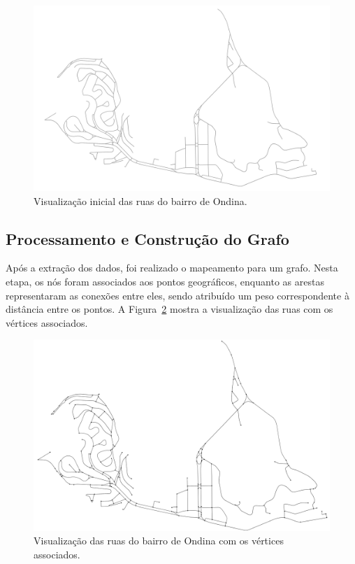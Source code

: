 \documentclass[12pt, a4paper]{report}
\begin{document}
\begin{figure}[H]
    \centering
    \includegraphics[width=\textwidth]{visualizacao_inicial}
    \caption{Visualização inicial das ruas do bairro de Ondina.}
    \label{fig:ondina_ruas}
\end{figure}

\subsection{Processamento e Construção do Grafo}

Após a extração dos dados, foi realizado o mapeamento para um grafo. Nesta etapa, os nós foram associados aos pontos geográficos, enquanto as arestas representaram as conexões entre eles, sendo atribuído um peso correspondente à distância entre os pontos. A Figura~\ref{fig:ondina_grafo_bruto} mostra a visualização das ruas com os vértices associados.

\begin{figure}[H]
    \centering
    \includegraphics[width=\textwidth]{ondina_grafo_bruto}
    \caption{Visualização das ruas do bairro de Ondina com os vértices associados.}
    \label{fig:ondina_grafo_bruto}
\end{figure}
\end{document}
